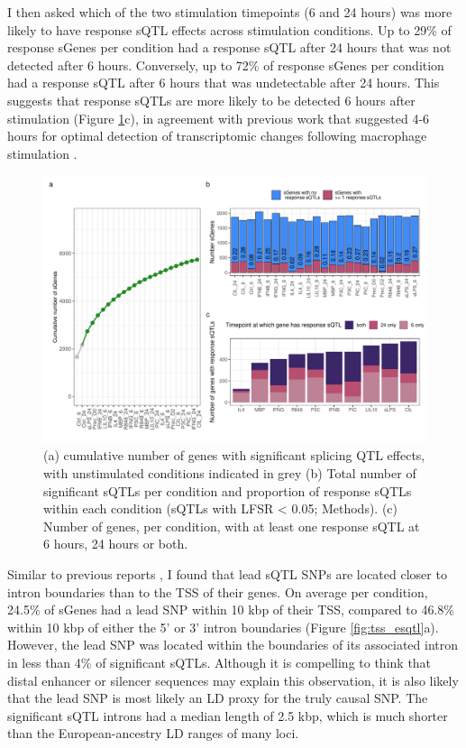 I then asked which of the two stimulation timepoints (6 and 24 hours) was more likely to have response sQTL effects across stimulation conditions. Up to 29\% of response sGenes per condition had a response sQTL after 24 hours that was not detected after 6 hours. Conversely, up to 72\% of response sGenes per condition had a response sQTL after 6 hours that was  undetectable after 24 hours. This suggests that response sQTLs are more likely to be detected 6 hours after stimulation (Figure \ref{fig:sqtl}c), in agreement with previous work that suggested 4-6 hours for optimal detection of transcriptomic changes following macrophage stimulation \cite{Unuvar_Purcu2022-zq,Sharif2007-np}. \\
\begin{figure}[H]
  \centering
  \includegraphics[width=\textwidth]{sqtl}
  \caption{(a) cumulative number of genes with significant splicing QTL effects, with unstimulated conditions indicated in grey (b) Total number of significant sQTLs per condition and proportion of response sQTLs within each condition (sQTLs with LFSR < 0.05; Methods). (c) Number of genes, per condition, with at least one response sQTL at 6 hours, 24 hours or both.}
  \label{fig:sqtl}   
\end{figure}

Similar to previous reports \cite{Garrido-Martin2021-sk}, I found that lead sQTL SNPs are located closer to intron boundaries than to the TSS of their genes. On average per condition, 24.5\% of sGenes had a lead SNP within 10 kbp of their TSS, compared to 46.8\% within 10 kbp of either the 5' or 3' intron boundaries (Figure \ref{fig:tss_esqtl}a). However, the lead SNP was located within the boundaries of its associated intron in less than 4\% of significant sQTLs. Although it is compelling to think that distal enhancer or silencer sequences may explain this observation, it is also likely that the lead SNP is most likely an LD proxy for the truly causal SNP. The significant sQTL introns had a median length of 2.5 kbp, which is much shorter than the European-ancestry LD ranges of many loci. \\

